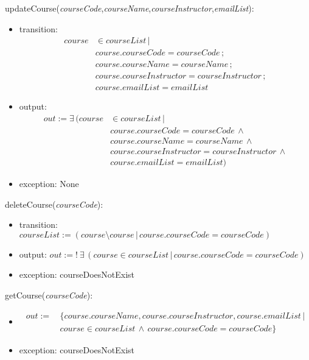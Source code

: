 \documentclass[12pt, titlepage]{article}
\begin{document}
\noindent updateCourse(\textit{courseCode},\textit{courseName},\textit{courseInstructor},\textit{emailList}):
\begin{itemize}
\item transition:
\begin{align*}
course &\in courseList \, | \\
&course.courseCode = courseCode \, ; \\
&course.courseName = courseName \, ; \\
&course.courseInstructor = courseInstructor \, ; \\
&course.emailList = emailList
\end{align*}
\item output: 
\begin{align*}
out := \exists \, (course &\in courseList \, | \\
&course.courseCode = courseCode \, \land \\
&course.courseName = courseName \, \land \\
&course.courseInstructor = courseInstructor \, \land \\
&course.emailList = emailList)
\end{align*}
\item exception: None
\end{itemize}


\noindent deleteCourse(\textit{courseCode}):
\begin{itemize}
\item transition: \(courseList := (course \setminus course \, | \, course.courseCode = courseCode )\)
\item output: $out := \mathit{! \ \exists \, (course \in courseList \, | \, course.courseCode = courseCode)
}$
\item exception: courseDoesNotExist
\end{itemize}

\noindent getCourse(\textit{courseCode}):
\begin{itemize}
\item 
\begin{align*}
out := &\, \{course.courseName, course.courseInstructor, course.emailList\, | \\
&\, course \in courseList \, \land \, course.courseCode = courseCode\}
\end{align*}

\item exception: courseDoesNotExist
\end{itemize}
\end{document}
